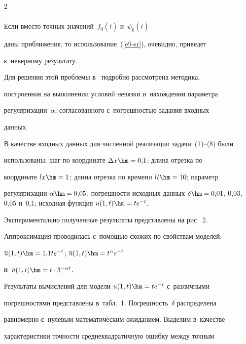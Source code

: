 \begin{multicols}{2}
\begin{multline}
  \label{e9-sr}

  \end{multline}

  

  Если вместо точных значений~$f_0(\overline{t})$ и~$\psi_0(\overline{t})$ 

даны приближения, то использование~(\ref{e9-sr}), очевидно, приведет 

к~неверному результату.

  

  Для решения этой проблемы в~\cite{15-sr} подробно рассмотрена методика, 

построенная на выполнении условий невязки и~нахождении параметра 

регуляризации~$\alpha$, согласованного с~погрешностью задания входных 

данных.

  

  В качестве входных данных для численной реализации задачи~(1)--(8) были 

использованы: шаг по координате $\Delta x\hm= 0{,}1$; длина отрезка по 

координате $lx\hm=1$; длина отрезка по времени $lt\hm=10$; параметр 

регуляризации $\alpha\hm=0{,}05$; погрешности исходных данных $\delta\hm= 

0{,}01$, 0,03, 0,05 и~0,1; исходная функция $u(1,t)\hm=te^{-t}$.

  

  Экспериментально полученные результаты представлены на рис.~2.

  

  Аппроксимация проводилась с~помощью схожих по свойствам моделей: 

$\overline{u}(1,t)\hm= 1{,}1 te^{-t}$; $\overline{u}(1,t)\hm= t^\alpha e^{-t}$ 

и~$\overline{u}(1,t)\hm= t\cdot 3^{-\alpha t}$.

  







  Результаты вычислений для модели $u(1,t)\hm= te^{-t}$ с~различными 

погрешностями представлены в~табл.~1. Погрешность~$\delta$ распределена 

равномерно с~нулевым математическим ожиданием. Выделим в~качестве 

характеристики точности среднеквадратичную ошибку между точным 


\end{multicols}
